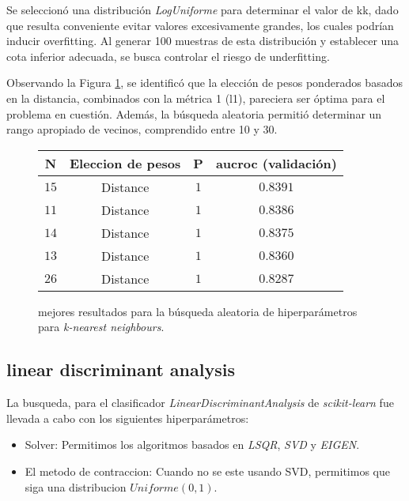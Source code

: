 Se seleccionó una distribución \textit{LogUniforme} para determinar el valor de kk, dado que resulta conveniente evitar valores excesivamente grandes, los cuales podrían inducir overfitting. Al generar 100 muestras de esta distribución y establecer una cota inferior adecuada, se busca controlar el riesgo de underfitting.

Observando la Figura \ref{knn}, se identificó que la elección de pesos ponderados basados en la distancia, combinados con la métrica 1 (l1), pareciera ser óptima para el problema en cuestión.
Además, la búsqueda aleatoria permitió determinar un rango apropiado de vecinos, comprendido entre 10 y 30.
\vspace{0.5em}
\begin{figure}[!htbp]
    \begin{center}
        \begin{tabular}{ |c|c|c|c| } 
         \hline
        N   & Eleccion de pesos & P  & aucroc (validación) \\
        \hline
        $15$             & Distance          &  $1$             & $0.8391$  \\ 
        $11$             & Distance          &  $1$             & $0.8386$  \\
        $14$             & Distance          &  $1$             & $0.8375$  \\ 
        $13$             & Distance          &  $1$             & $0.8360$  \\
        $26$             & Distance          &  $1$             & $0.8287$  \\ 
        \hline
        \end{tabular}
    \end{center}
    \caption{mejores resultados para la búsqueda aleatoria de hiperparámetros para \textit{k-nearest neighbours}.} \label{knn}
\end{figure}

\subsection{linear discriminant analysis}
La busqueda, para el clasificador \textit{LinearDiscriminantAnalysis} de \textit{scikit-learn} fue llevada a cabo con los siguientes hiperparámetros: 

\begin{itemize}
    \item Solver: Permitimos los algoritmos basados en \textit{LSQR}, \textit{SVD} y \textit{EIGEN}.
    \item El metodo de contraccion: Cuando no se este usando SVD, permitimos que siga una distribucion $Uniforme(0,1)$.
\end{itemize}

